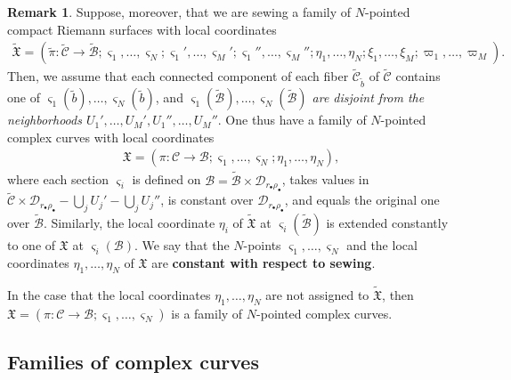 \documentclass[12pt,a4paper,notitlepage]{report}
\theoremstyle{definition}
\newtheorem{rem}[df]{Remark}
\theoremstyle{plain}
\newcommand{\fk}{\mathfrak}
\newcommand{\mc}{\mathcal}
\newcommand{\wtd}{\widetilde}
\newcommand{\sgm}{\varsigma}
\newcommand{\blt}{\bullet}
\numberwithin{equation}{section}
\begin{document}
\begin{rem}\label{lb39}
Suppose, moreover, that we are sewing a family of $N$-pointed compact Riemann surfaces with local coordinates
\begin{align*}
\wtd{\fk X}=(\wtd\pi:\wtd{\mc C}\rightarrow\wtd{\mc B};\sgm_1,\dots,\sgm_N;\sgm_1',\dots,\sgm_M';\sgm_1'',\dots,\sgm_M'';\eta_1,\dots,\eta_N;\xi_1,\dots,\xi_M;\varpi_1,\dots,\varpi_M).
\end{align*}
Then, we assume that each connected component of each fiber $\wtd{\mc C}_{\wtd b}$ of $\wtd{\mc C}$ contains one of $\sgm_1(\wtd b),\dots,\sgm_N(\wtd b)$, and  \emph{$\sgm_1(\wtd{\mc B}),\dots,\sgm_N(\wtd{\mc B})$ are disjoint from the neighborhoods $U_1',\dots,U_M',U_1'',\dots,U_M''$}. One thus have a family of $N$-pointed complex curves with local coordinates
\begin{align*}
\fk X=(\pi:\mc C\rightarrow\mc B;\sgm_1,\dots,\sgm_N;\eta_1,\dots,\eta_N),
\end{align*}
where each section $\sgm_i$ is defined on $\mc B=\wtd{\mc B}\times\mc D_{r_\blt\rho_\blt}$, takes values in $\wtd {\mc C}\times\mc D_{r_\blt\rho_\blt}-\bigcup_j U_j'-\bigcup_j U_j''$, is constant over $\mc D_{r_\blt\rho_\blt}$, and equals the original one  over  $\wtd{\mc B}$. Similarly, the local coordinate $\eta_i$ of $\wtd{\fk X}$ at $\sgm_i(\wtd{\mc B})$ is extended constantly to one of $\fk X$ at $\sgm_i(\mc B)$. We say that the $N$-points $\sgm_1,\dots,\sgm_N$ and the local coordinates $\eta_1,\dots,\eta_N$ of $\fk X$ are \textbf{constant with respect to sewing}.

In the case that the local coordinates $\eta_1,\dots,\eta_N$ are not assigned to $\wtd{\fk X}$, then $\fk X=(\pi:\mc C\rightarrow\mc B;\sgm_1,\dots,\sgm_N)$ is a family of $N$-pointed complex curves.
\end{rem}

 


\subsection*{Families of complex curves}
\end{document}
